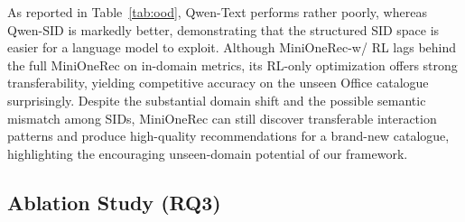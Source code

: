 As reported in Table~\ref{tab:ood}, Qwen-Text performs rather poorly, whereas Qwen-SID is markedly better, demonstrating that the structured SID space is easier for a language model to exploit. 
Although MiniOneRec-w/ RL lags behind the full MiniOneRec on in-domain metrics, its RL-only optimization offers strong transferability, yielding competitive accuracy on the unseen Office catalogue surprisingly.
Despite the substantial domain shift and the possible semantic mismatch among SIDs, MiniOneRec can still discover transferable interaction patterns and produce high-quality recommendations for a brand-new catalogue, highlighting the encouraging unseen-domain potential of our framework.





\subsection{Ablation Study (RQ3)}


